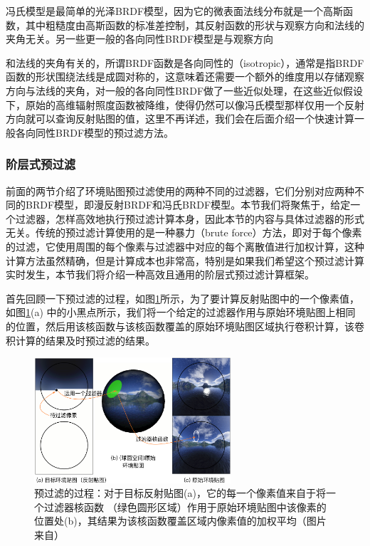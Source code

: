 冯氏模型是最简单的光泽BRDF模型，因为它的微表面法线分布就是一个高斯函数，其中粗糙度由高斯函数的标准差控制，其反射函数的形状与观察方向和法线的夹角无关。另一些更一般的各向同性BRDF模型是与观察方向

和法线的夹角有关的，所谓BRDF函数是各向同性的（isotropic），通常是指BRDF函数的形状围绕法线是成圆对称的，这意味着还需要一个额外的维度用以存储观察方向与法线的夹角，\cite{a:Approximationofglossyreflectionwithprefilteredenvironmentmaps,a:Reflectionspaceimagebasedrendering}对一般的各向同性BRDF做了一些近似处理，在这些近似假设下，原始的高维辐射照度函数被降维，使得仍然可以像冯氏模型那样仅用一个反射方向就可以查询反射贴图的值，这里不再详述，我们会在后面介绍一个快速计算一般各向同性BRDF模型的预过滤方法。



\subsubsection{阶层式预过滤}
前面的两节介绍了环境贴图预过滤使用的两种不同的过滤器，它们分别对应两种不同的BRDF模型，即漫反射BRDF和冯氏BRDF模型。本节我们将聚焦于，给定一个过滤器，怎样高效地执行预过滤计算本身，因此本节的内容与具体过滤器的形式无关。传统的预过滤计算使用的是一种暴力（brute force）方法，即对于每个像素的过滤，它使用周围的每个像素与过滤器中对应的每个离散值进行加权计算，这种计算方法虽然精确，但是计算成本也非常高，特别是如果我们希望这个预过滤计算实时发生，本节我们将介绍一种高效且通用的阶层式预过滤计算框架。

首先回顾一下预过滤的过程，如图\ref{f:pl-pl-pre-filtering-3}所示，为了要计算反射贴图中的一个像素值，如图\ref{f:pl-pl-pre-filtering-3}(a) 中的小黑点所示，我们将一个给定的过滤器作用与原始环境贴图上相同的位置，然后用该核函数与该核函数覆盖的原始环境贴图区域执行卷积计算，该卷积计算的结果及时预过滤的结果。

\begin{figure}
	\sidecaption
	\includegraphics[width=0.65\textwidth]{figures/pl/pl-prefiltering-3}
	\caption{预过滤的过程：对于目标反射贴图(a)，它的每一个像素值来自于将一个过滤器核函数 （绿色圆形区域）作用于原始环境贴图中该像素的位置处(b)，其结果为该核函数覆盖区域内像素值的加权平均（图片来自\cite{a:Aunifiedapproachtoprefilteredenvironmentmaps}）}
	\label{f:pl-pl-pre-filtering-3}
\end{figure}


